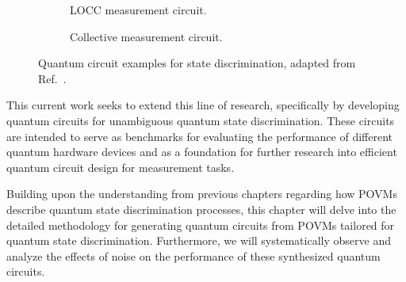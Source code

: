 \begin{figure}[htbp]
    \centering
    \begin{subfigure}[b]{0.48\textwidth}
        \centering
        \caption{LOCC measurement circuit.}
        \label{subfig:locc_circuit}
    \end{subfigure}
    \hfill %
    \begin{subfigure}[b]{0.48\textwidth}
        \centering
        \caption{Collective measurement circuit.}
        \label{subfig:collective_circuit}
    \end{subfigure}
    \caption{Quantum circuit examples for state discrimination, adapted from Ref.~\cite{RN87}.}
    \label{fig:collective_meas_circuit}
\end{figure}

This current work seeks to extend this line of research, specifically by
developing quantum circuits for unambiguous quantum state discrimination.
These circuits are intended to serve as benchmarks for evaluating the performance
of different quantum hardware devices and as a foundation for further research
into efficient quantum circuit design for measurement tasks.

Building upon the understanding from previous chapters regarding how POVMs
describe quantum state discrimination processes, this chapter will delve into
the detailed methodology for generating quantum circuits from POVMs tailored
for quantum state discrimination.
Furthermore, we will systematically observe and analyze the effects of noise
on the performance of these synthesized quantum circuits.

